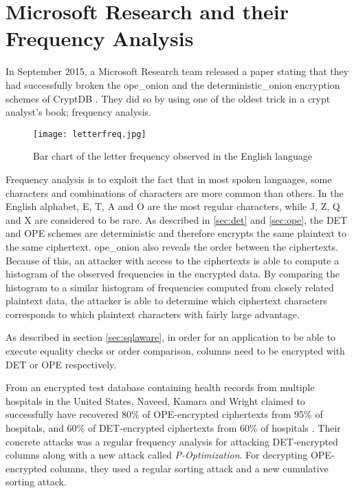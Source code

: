 \section{Microsoft Research and their Frequency Analysis}

In September 2015, a Microsoft Research team released a paper stating that they had successfully broken the \gls{ope_onion} and the \gls{deterministic_onion} encryption schemes of CryptDB \cite{microsoft_cryptdb}. They did so by using one of the oldest trick in a crypt analyst's book; frequency analysis.

\begin{wrapfigure}[13]{r}[1pt]{5.2cm}
\centering
\texttt{[image: letterfreq.jpg]}
\caption{Bar chart of the letter frequency observed in the English language}
\label{fig:letter_freq}
\end{wrapfigure}
Frequency analysis is to exploit the fact that in most spoken languages, some characters and combinations of characters are more common than others. In the English alphabet, E, T, A and O are the most regular characters, while J, Z, Q and X are considered to be rare. As described in \ref{sec:det} and \ref{sec:ope}, the DET and OPE schemes are deterministic and therefore encrypts the same plaintext to the same ciphertext. \gls{ope_onion} also reveals the order between the ciphertexts. Because of this, an attacker with access to the ciphertexts is able to compute a histogram of the observed frequencies in the encrypted data. By comparing the histogram to a similar histogram of frequencies computed from closely related plaintext data, the attacker is able to determine which ciphertext characters corresponds to which plaintext characters with fairly large advantage.

As described in section \ref{sec:sqlaware}, in order for an application to be able to execute equality checks or order comparison, columns need to be encrypted with DET or OPE respectively. 




From an encrypted test database containing health records from multiple hospitals in the United States, Naveed, Kamara and Wright claimed to successfully have recovered 80\% of OPE-encrypted ciphertexts from 95\% of hospitals, and 60\% of DET-encrypted ciphertexts from 60\% of hospitals \cite{microsoft_cryptdb}. Their concrete attacks was a regular frequency analysis for attacking DET-encrypted columns along with a new attack called \emph{P-Optimization}. For decrypting OPE-encrypted columns, they used a regular sorting attack and a new cumulative sorting attack.

